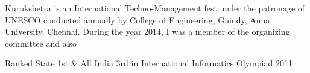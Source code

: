 \begin{cventries}
{\begin{cvitems}
        \item{Kurukshetra is an International Techno-Management fest under the patronage of UNESCO conducted annually by College of Engineering, Guindy, Anna University, Chennai. During the year 2014, I was a member of the organizing committee and also}
        \item{Ranked State 1st \& All India 3rd in International Informatics Olympiad 2011}
      \end{cvitems}
        }
\end{cventries}
